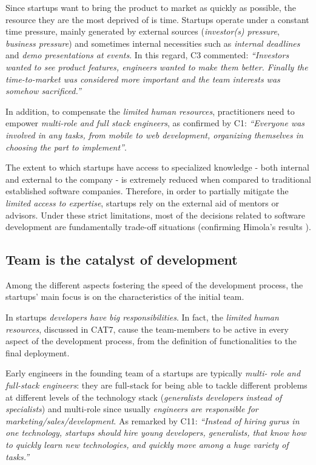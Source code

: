 \documentclass[10pt,journal,letterpaper,compsoc]{IEEEtran}
\begin{document}
Since startups want to bring the product to market as quickly as possible, the
resource they are the most deprived of is time. Startups operate under a
constant time pressure, mainly generated by external sources
(\textit{investor(s) pressure}, \textit{business pressure}) and sometimes
internal necessities such as \textit{internal deadlines} and \textit{demo
presentations at events}. In this regard, C3 commented: \textit{``Investors
wanted to see product features, engineers wanted to make them better. Finally
the time-to-market was considered more important and the team interests was
somehow sacrificed.''}

In addition, to compensate the \textit{limited human resources},  practitioners
need to empower \textit{multi-role and full stack engineers}, as confirmed by
C1: \textit{``Everyone was involved in any tasks, from mobile to web
development, organizing themselves in choosing the part to implement''}.

The extent to which startups have access to specialized knowledge - both
internal and external to the company - is extremely reduced when compared to
traditional established software companies. Therefore, in order to partially
mitigate the \textit{limited access to expertise}, startups rely on the external
aid of mentors or advisors. Under these strict limitations, most of the
decisions related to software development are fundamentally trade-off
situations (confirming Himola's results \cite{Hilmola2003}).
\subsection{Team is the catalyst of development} \label{res:gsm:cat4} 
Among the different aspects fostering the speed of the development process, 
the startups' main focus is on the characteristics of the initial team.

In startups \textit{developers have big responsibilities}. In fact, the
\textit{limited human resources}, discussed in CAT7, cause the team-members to
be active in every aspect of the development process, from the definition of
functionalities to the final deployment.

Early engineers in the founding team of a startups are typically  \textit{multi-
role and full-stack engineers}: they are full-stack for being able  to tackle
different problems at different levels of the technology stack
(\textit{generalists developers instead of specialists}) and multi-role since
usually \textit{engineers are responsible for marketing/sales/development}. As
remarked by  C11: \textit{``Instead of hiring gurus in one technology, startups
should hire young developers, generalists, that know how to quickly learn new
technologies, and quickly move among a huge variety of tasks.''}
\end{document}
